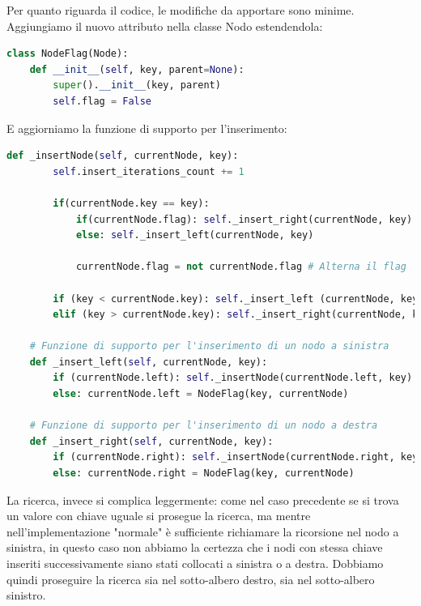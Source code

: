 \documentclass{article}
\begin{document}
Per quanto riguarda il codice, le modifiche da apportare sono minime.
Aggiungiamo il nuovo attributo nella classe Nodo estendendola:

\begin{lstlisting}[language=Python, caption={Classe Nodo di un BST con Flag Booleano}]
class NodeFlag(Node):
    def __init__(self, key, parent=None):
        super().__init__(key, parent)
        self.flag = False
\end{lstlisting}

E aggiorniamo la funzione di supporto per l'inserimento:

\begin{lstlisting}[language=Python]
  def _insertNode(self, currentNode, key):
        self.insert_iterations_count += 1
        
        if(currentNode.key == key):
            if(currentNode.flag): self._insert_right(currentNode, key)
            else: self._insert_left(currentNode, key)

            currentNode.flag = not currentNode.flag # Alterna il flag
    
        if (key < currentNode.key): self._insert_left (currentNode, key)
        elif (key > currentNode.key): self._insert_right(currentNode, key)

    # Funzione di supporto per l'inserimento di un nodo a sinistra
    def _insert_left(self, currentNode, key):
        if (currentNode.left): self._insertNode(currentNode.left, key)
        else: currentNode.left = NodeFlag(key, currentNode)

    # Funzione di supporto per l'inserimento di un nodo a destra
    def _insert_right(self, currentNode, key):
        if (currentNode.right): self._insertNode(currentNode.right, key)
        else: currentNode.right = NodeFlag(key, currentNode)
\end{lstlisting}



La ricerca, invece si complica leggermente: come nel caso precedente se si trova un valore con chiave uguale si prosegue la ricerca, ma mentre nell'implementazione "normale" è sufficiente richiamare la ricorsione nel nodo a sinistra, in questo caso non abbiamo la certezza che i nodi con stessa chiave inseriti successivamente siano stati collocati a sinistra o a destra. Dobbiamo quindi proseguire la ricerca sia nel sotto-albero destro, sia nel sotto-albero sinistro.
\end{document}
